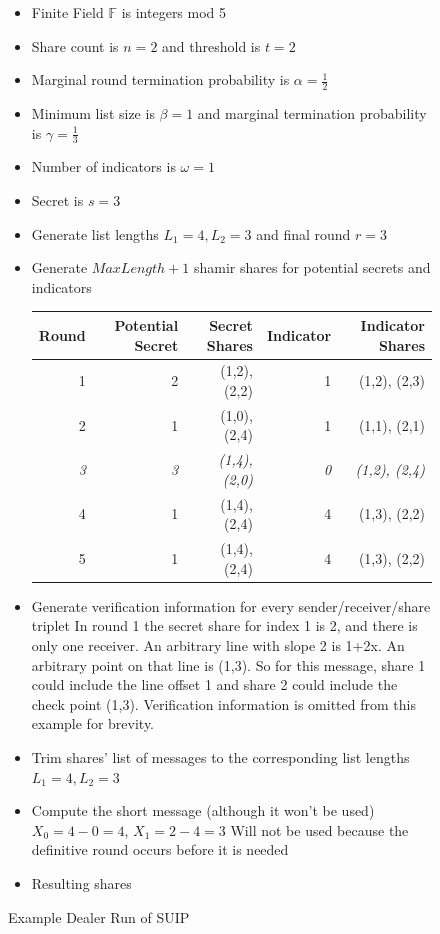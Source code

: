 \documentclass{dalcsthesis}
\begin{document}
\begin{figure}
  \caption{Example Dealer Run of SUIP}
  \label{Ex:SUIP}
  \begin{itemize}
    \item Finite Field $\mathbb{F}$ is integers mod 5
    \item Share count is $n = 2$ and threshold is $t = 2$
    \item Marginal round termination probability is $\alpha = \frac{1}{2}$
    \item Minimum list size is $\beta = 1$ and marginal termination probability is $\gamma = \frac{1}{3}$
    \item Number of indicators is $\omega = 1$
    \item Secret is $s = 3$
    \item Generate list lengths $L_1 = 4, L_2 = 3$ and final round $r = 3$
    \item Generate $MaxLength+1$ shamir shares for potential secrets and indicators
  
      \begin{tabular}{|r|r|r|r|r|}
      \hline
        Round & Potential Secret & Secret Shares & Indicator & Indicator Shares \\
      \hline
        1 & 2  & (1,2), (2,2) & 1 & (1,2), (2,3) \\
      \hline
        2 & 1  & (1,0), (2,4) & 1 & (1,1), (2,1) \\
      \hline
        \emph{3} & \emph{3}  & \emph{(1,4), (2,0)} & \emph{0} & \emph{(1,2), (2,4)} \\
      \hline
        4 & 1  & (1,4), (2,4) & 4 & (1,3), (2,2) \\
      \hline
        5 & 1  & (1,4), (2,4) & 4 & (1,3), (2,2) \\
      \hline
      \end{tabular}
      
    \item Generate verification information for every sender/receiver/share triplet
    \subitem In round 1 the secret share for index 1 is 2, and there is only one receiver. An arbitrary line with slope 2 is 1+2x. An arbitrary point on that line is (1,3). So for this message, share 1 could include the line offset 1 and share 2 could include the check point (1,3).
    \subitem Verification information is omitted from this example for brevity.
    
    \item Trim shares' list of messages to the corresponding list lengths $L_1 = 4, L_2 = 3$
    \item Compute the short message (although it won't be used)
    \subitem $X_0 = 4 - 0 = 4$, $X_1 = 2 - 4 = 3$
    \subitem Will not be used because the definitive round occurs before it is needed
    \item Resulting shares
    

\end{itemize}
\end{figure}
\end{document}

